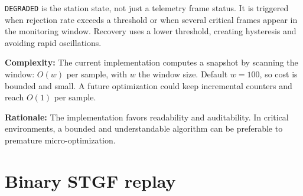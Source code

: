 \documentclass[10pt,a4paper]{article}
\newcommand{\complexity}[1]{\textbf{Complexity:} #1}
\newcommand{\rationale}[1]{\textbf{Rationale:} #1}
\begin{document}
\texttt{DEGRADED} is the station state, not just a telemetry frame status. It is triggered when rejection rate exceeds a threshold or when several critical frames appear in the monitoring window. Recovery uses a lower threshold, creating hysteresis and avoiding rapid oscillations.

\complexity{The current implementation computes a snapshot by scanning the window: $O(w)$ per sample, with $w$ the window size. Default $w=100$, so cost is bounded and small. A future optimization could keep incremental counters and reach $O(1)$ per sample.}

\rationale{The implementation favors readability and auditability. In critical environments, a bounded and understandable algorithm can be preferable to premature micro-optimization.}

\section{Binary STGF replay}
\end{document}
